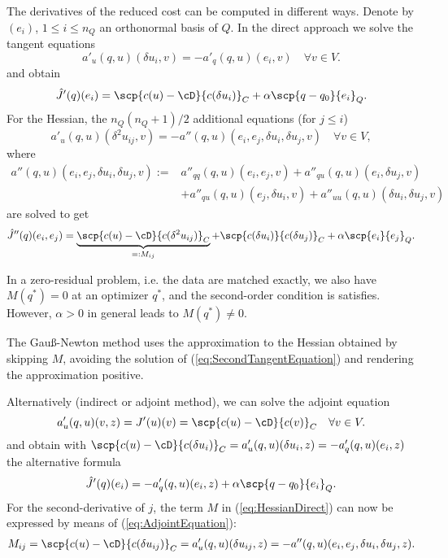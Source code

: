 The derivatives of the reduced cost can  be computed in different ways. 
Denote by $(e_i)$, $1\le i\le n_Q$ an orthonormal basis of $Q$. In the direct approach we solve the tangent equations
%
\begin{equation}\label{eq:TangentEquation}
a'_u(q,u)(\delta u_i, v) = -a'_q(q,u)(e_i, v)\quad \forall v\in V. 
\end{equation}
%
and obtain
%
\begin{equation}\label{eq:GradDirect}
\hat J'(q)(e_i) = \scp{c(u)-\cD}{c(\delta u_i)}_C + \alpha\scp{q-q_0}{e_i}_Q.
\end{equation}
%
For the Hessian, the $n_Q(n_Q+1)/2$ additional equations (for $j\le i$)
%
\begin{equation}\label{eq:SecondTangentEquation}
a'_u(q,u)(\delta^2 u_{ij}, v) = -a''(q,u)(e_i, e_j, \delta u_i, \delta u_j, v)\quad \forall v\in V, 
\end{equation}
%
where 
%
\begin{align*}
a''(q,u)(e_i,e_j,\delta u_i,\delta u_j,v):=&a''_{qq}(q,u)(e_i, e_j, v)+a''_{qu}(q,u)(e_i, \delta u_j, v)
\\&+a''_{qu}(q,u)(e_j, \delta u_i, v)+a''_{uu}(q,u)(\delta u_i, \delta u_j, v)
\end{align*}
% 
are solved to get
%
\begin{equation}\label{eq:HessianDirect}
\hat J''(q)(e_i,e_j) = \underbrace{\scp{c(u)-\cD}{c(\delta^2 u_{ij})}_C}_{=:M_{ij}} +\scp{c(\delta u_i)}{c(\delta u_j)}_C + \alpha\scp{e_i}{e_j}_Q.
\end{equation}
%
%
\begin{remark}\label{rmk:}
In a zero-residual problem, i.e. the data are matched exactly, we also have $M(q^*)=0$ at an optimizer $q^*$, and the second-order condition is satisfies. However, $\alpha>0$ in general leads to $M(q^*)\ne0$.
\end{remark}
%
\begin{remark}\label{rmk:}
The Gau\ss-Newton method uses the approximation to the Hessian obtained by skipping $M$, avoiding the solution of (\ref{eq:SecondTangentEquation}) and rendering the approximation positive.
\end{remark}
%
Alternatively (indirect or adjoint method), we can solve the adjoint equation
%
\begin{equation}\label{eq:AdjointEquation}
a'_u(q,u)(v, z) = J'(u)(v) = \scp{c(u)-\cD}{c(v)}_C \quad \forall v\in V. 
\end{equation}
%
and obtain with $\scp{c(u)-\cD}{c(\delta u_i)}_C = a'_u(q,u)(\delta u_i, z) = -a'_q(q,u)(e_i, z)$ the alternative formula
%
\begin{equation}\label{eq:GradInDirect}
\hat J'(q)(e_i) = -a'_q(q,u)(e_i, z) + \alpha\scp{q-q_0}{e_i}_Q.
\end{equation}
%
For the second-derivative of $j$, the term $M$ in (\ref{eq:HessianDirect}) can now be expressed by means of 
(\ref{eq:AdjointEquation}):
%
\begin{align*}
M_{ij} = \scp{c(u)-\cD}{c(\delta u_{ij})}_C = a'_u(q,u)(\delta u_{ij}, z) = -a''(q,u)(e_i, e_j, \delta u_i, \delta u_j, z).
\end{align*}
%



